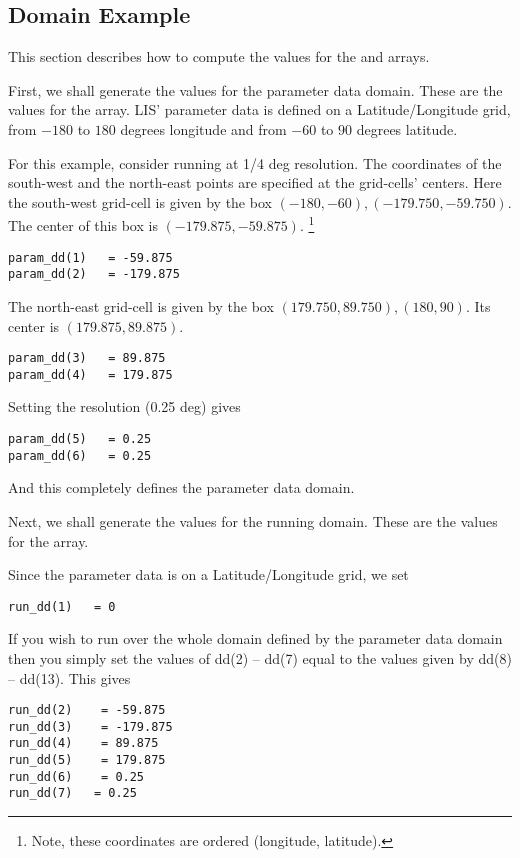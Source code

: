 
\subsection{Domain Example} \label{sec:dd_example}
This section describes how to compute the values for the 
and  arrays.

First, we shall generate the values for the parameter data domain.  These
are the values for the  array.  LIS' parameter data is defined 
on a Latitude/Longitude grid, from $-180$ to $180$ degrees longitude and 
from $-60$ to $90$ degrees latitude.

For this example, consider running at 1/4 deg resolution.  The coordinates
of the south-west and the north-east points are specified at the grid-cells' 
centers.
Here the south-west grid-cell is given by the box
$(-180,-60), (-179.750,-59.750)$.
The center of this box is $(-179.875,-59.875)$.
\footnote{Note, these coordinates are ordered (longitude, latitude).}
\begin{verbatim}
param_dd(1)   = -59.875
param_dd(2)   = -179.875
\end{verbatim}

The north-east grid-cell is given by the box $(179.750,89.750), (180,90)$.
Its center is $(179.875,89.875)$.
\begin{verbatim}
param_dd(3)   = 89.875
param_dd(4)   = 179.875
\end{verbatim}

Setting the resolution (0.25 deg) gives
\begin{verbatim}
param_dd(5)   = 0.25
param_dd(6)   = 0.25
\end{verbatim}

And this completely defines the parameter data domain.


Next, we shall generate the values for the running domain.  These
are the values for the  array.

Since the parameter data is on a Latitude/Longitude grid, we set
\begin{verbatim}
run_dd(1)   = 0
\end{verbatim}

If you wish to run over the whole domain defined by the parameter data
domain then you simply set the values of dd(2) -- dd(7) equal to
the values given by dd(8) -- dd(13).  This gives
\begin{verbatim}
run_dd(2)    = -59.875
run_dd(3)    = -179.875
run_dd(4)    = 89.875
run_dd(5)    = 179.875
run_dd(6)    = 0.25
run_dd(7)   = 0.25
\end{verbatim}

